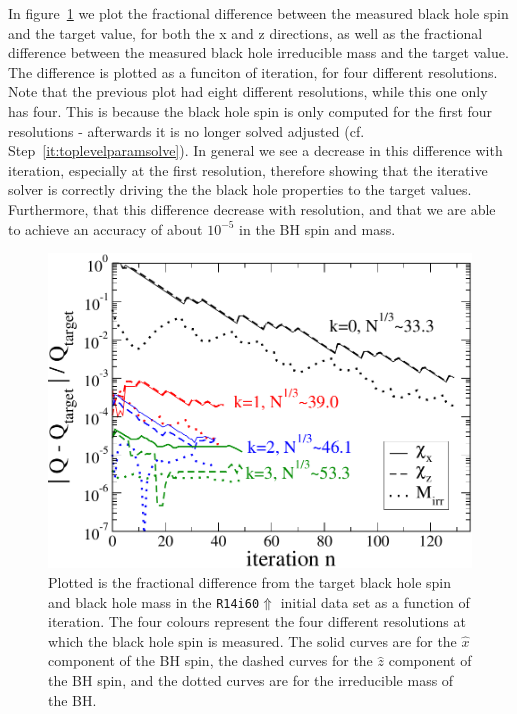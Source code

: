 In figure~\ref{Fig:BHSpinConv} we plot the fractional difference between the measured black hole spin and the target value, for both the x and z directions, as well as the fractional difference between
the measured black hole irreducible mass and the target value. The
difference is plotted as a funciton of iteration, for four different
resolutions. Note that the previous plot had eight different
resolutions, while this one only has four. This is because the black
hole spin is only computed for the first four resolutions - afterwards
it is no longer solved adjusted (cf. Step~\ref{it:toplevelparamsolve}). In general we see a decrease in this difference with iteration, especially at the first resolution, therefore showing that the iterative solver is correctly driving the the black hole properties to the target values.
Furthermore, that this difference decrease with resolution, and that
we are able to achieve an accuracy of about $10^{-5}$ in the BH spin
and mass. 

\begin{figure}
\includegraphics[width=0.95\columnwidth]{chap4/BHSpinConv}
\caption[Convergence of black hole spin and
mass.]{\label{Fig:BHSpinConv}Plotted is the fractional difference from the target black hole spin and black hole mass in the {\tt R14i60$\Uparrow$} initial data set as a function of iteration. The four colours represent 
the four different resolutions at which the black hole spin is measured. The solid curves are for the $\hat{x}$ component of the BH spin, the dashed curves for the $\hat{z}$ component of the BH spin, and
the dotted curves are for the irreducible mass of the BH.}
\end{figure}

